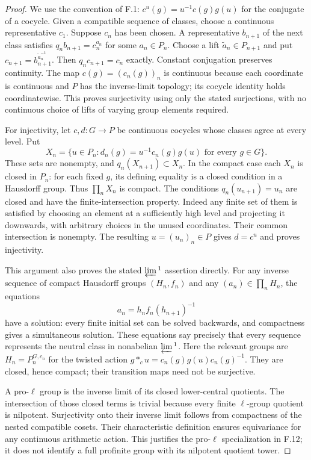 \begin{proof}
We use the convention of F.1:
$c^u(g)=u^{-1}c(g)g(u)$ for the conjugate of a cocycle.
Given a compatible sequence of classes, choose a continuous
representative $c_1$. Suppose $c_n$ has been chosen. A representative
$b_{n+1}$ of the next class satisfies
$q_n b_{n+1}=c_n^{a_n}$ for some $a_n\in P_n$.
Choose a lift $\widetilde a_n\in P_{n+1}$ and put
$c_{n+1}=b_{n+1}^{\widetilde a_n^{-1}}$. Then
$q_nc_{n+1}=c_n$ exactly. Constant conjugation preserves
continuity. The map $c(g)=(c_n(g))_n$ is continuous because each
coordinate is continuous and $P$ has the inverse-limit topology;
its cocycle identity holds coordinatewise. This proves surjectivity
using only the stated surjections, with no continuous choice of
lifts of varying group elements required.

For injectivity, let $c,d:G\to P$ be continuous cocycles whose
classes agree at every level. Put
\[
 X_n=\{u\in P_n:d_n(g)=u^{-1}c_n(g)g(u)
                         \text{ for every }g\in G\}.
\]
These sets are nonempty, and $q_n(X_{n+1})\subset X_n$.
In the compact case each $X_n$ is closed in $P_n$: for each fixed
$g$, its defining equality is a closed condition in a Hausdorff
group. Thus $\prod_nX_n$ is compact. The conditions
$q_n(u_{n+1})=u_n$ are closed and have the finite-intersection
property. Indeed any finite set of them is satisfied by choosing
an element at a sufficiently high level and projecting it
downwards, with arbitrary choices in the unused coordinates.
Their common intersection is nonempty. The resulting
$u=(u_n)_n\in P$ gives $d=c^u$ and proves injectivity.

This argument also proves the stated $\varprojlim{}^1$ assertion
directly. For any inverse sequence of compact Hausdorff groups
$(H_n,f_n)$ and any $(a_n)\in\prod_nH_n$, the equations
\[
                    a_n=h_n f_n(h_{n+1})^{-1}
\]
have a solution: every finite initial set can be solved backwards,
and compactness gives a simultaneous solution. These equations
say precisely that every sequence represents the neutral class
in nonabelian $\varprojlim{}^1$. Here the relevant groups are
$H_n=P_n^{G,c_n}$ for the twisted action
$g*_cu=c_n(g)g(u)c_n(g)^{-1}$. They are closed, hence compact;
their transition maps need not be surjective.

A pro-$\ell$ group is the inverse limit of its closed
lower-central quotients. The intersection of those closed terms
is trivial because every finite $\ell$-group quotient is
nilpotent. Surjectivity onto their inverse limit follows from
compactness of the nested compatible cosets. Their characteristic
definition ensures equivariance for any continuous arithmetic
action. This justifies the pro-$\ell$ specialization in F.12;
it does not identify a full profinite group with its nilpotent
quotient tower.


\end{proof}
